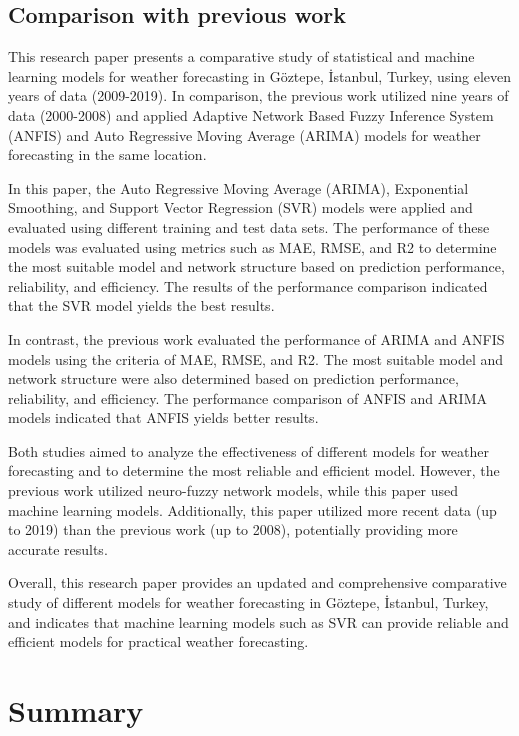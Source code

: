 \documentclass[conference,letterpaper]{IEEEtran}
\begin{document}
\subsection{Comparison with previous work}
This research paper presents a comparative study of statistical and machine learning models for weather forecasting in Göztepe, İstanbul, Turkey, using eleven years of data (2009-2019). In comparison, the previous work utilized nine years of data (2000-2008) and applied Adaptive Network Based Fuzzy Inference System (ANFIS) and Auto Regressive Moving Average (ARIMA) models for weather forecasting in the same location.

In this paper, the Auto Regressive Moving Average (ARIMA), Exponential Smoothing, and Support Vector Regression (SVR) models were applied and evaluated using different training and test data sets. The performance of these models was evaluated using metrics such as MAE, RMSE, and R2 to determine the most suitable model and network structure based on prediction performance, reliability, and efficiency. The results of the performance comparison indicated that the SVR model yields the best results.

In contrast, the previous work evaluated the performance of ARIMA and ANFIS models using the criteria of MAE, RMSE, and R2. The most suitable model and network structure were also determined based on prediction performance, reliability, and efficiency. The performance comparison of ANFIS and ARIMA models indicated that ANFIS yields better results.

Both studies aimed to analyze the effectiveness of different models for weather forecasting and to determine the most reliable and efficient model. However, the previous work utilized neuro-fuzzy network models, while this paper used machine learning models. Additionally, this paper utilized more recent data (up to 2019) than the previous work (up to 2008), potentially providing more accurate results.

Overall, this research paper provides an updated and comprehensive comparative study of different models for weather forecasting in Göztepe, İstanbul, Turkey, and indicates that machine learning models such as SVR can provide reliable and efficient models for practical weather forecasting.


\section{Summary}
\end{document}
